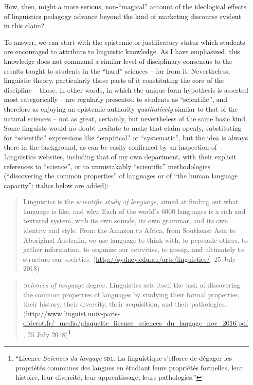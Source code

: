 \documentclass[output=paper]{langscibook}
\begin{document}
How, then, might a more serious, non-``magical'' account of the ideological effects of linguistics pedagogy advance beyond the kind of marketing discourse evident in this claim?

To answer, we can start with the epistemic or justificatory status which students are encouraged to attribute to linguistic knowledge. As I have emphasized, this knowledge does not command a similar level of disciplinary consensus to the results taught to students in the ``hard'' sciences -- far from it.  Nevertheless, linguistic theory, particularly those parts of it constituting the core of the discipline -- those, in other words, in which the unique form hypothesis is asserted most categorically -- are regularly presented to students as ``scientific'', and therefore as enjoying an epistemic authority \emph{qualitatively} similar to that of the natural sciences -- not as great, certainly, but nevertheless of the same basic kind. Some linguists would no doubt hesitate to make that claim openly, substituting for ``scientific'' expressions like ``empirical'' or ``systematic'', but the idea is always there in the background, as can be easily confirmed by an inspection of Linguistics websites, including that of my own department, with their explicit references to ``science'', or to unmistakably ``scientific'' methodologies (``discovering the common properties'' of languages or of ``the human language capacity''; italics below are added):

\begin{quotation}
Linguistics is the \emph{scientific study of language}, aimed at finding out what language is like, and why. Each of the world's 6000 languages is a rich and textured system, with its own sounds, its own grammar, and its own identity and style. From the Amazon to Africa, from Southeast Asia to Aboriginal Australia, we use language to think with, to persuade others, to gather information, to organize our activities, to gossip, and ultimately to structure our societies. (\url{http://sydney.edu.au/arts/linguistics/}, 25 July 2018)
\end{quotation}

\begin{quotation}
\emph{Sciences of language} degree. Linguistics sets itself the task of discovering the common properties of languages by studying their formal properties, their history, their diversity, their acquisition, and their pathologies. (\url{http://www.linguist.univ-paris-diderot.fr/\_media/plaquette_licence_sciences_du_langage_nov_2016.pdf}, 25 July 2018)\footnote{``Licence \emph{Sciences du langage} \textsc{sdl}. La linguistique s'efforce de dégager les propriétés communes des langues en étudiant leurs propriétés formelles, leur histoire, leur diversité, leur apprentissage, leurs pathologies.''}
\end{quotation}
\end{document}
